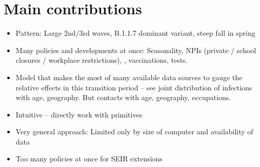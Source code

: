 

\section{Main contributions}

\begin{itemize}
    \item Pattern: Large 2nd/3rd waves, B.1.1.7 dominant variant, steep fall in spring
    \item Many policies and developments at once: Seasonality, NPIs (private / school closures / workplace restrictions), , vaccinations, tests.
    \item Model that makes the most of many available data sources to gauge the relative effects in this transition period -- see joint distribution of infections with age, geography. But contacts with age, geography, occupations.
    \item Intuitive -- directly work with primitives
    \item Very general approach: Limited only by size of computer and availability of data
    \item Too many policies at once for SEIR extensions
\end{itemize}





